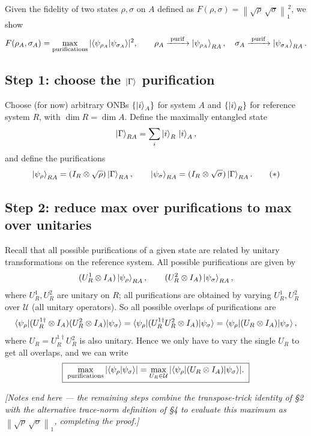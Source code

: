 \documentclass[11pt]{article}
\newcommand{\onenorm}[1]{\left\lVert #1 \right\rVert_{1}}
\newcommand{\Uni}{\mathcal{U}}
\begin{document}
Given the fidelity of two states $\rho,\sigma$ on $A$ defined as
$F(\rho,\sigma) = \onenorm{\sqrt{\rho}\,\sqrt{\sigma}}^{\,2}$, we show
\[
F(\rho_A,\sigma_A) = \max_{\text{purifications}}
|\!\braket{\psi_{\rho_A}|\psi_{\sigma_A}}\!|^{2},
\qquad
\rho_A \xrightarrow{\text{ purif }} \ket{\psi_{\rho_A}}_{RA},\quad
\sigma_A \xrightarrow{\text{ purif }} \ket{\psi_{\sigma_A}}_{RA}.
\]

\subsection{Step 1: choose the \texorpdfstring{$\ket{\Gamma}$}{Gamma} purification}

Choose (for now) arbitrary ONBs $\{\ket{i}_A\}$ for system $A$ and
$\{\ket{i}_R\}$ for reference system $R$, with $\dim R = \dim A$. Define the
maximally entangled state
\[
\ket{\Gamma}_{RA} = \sum_i \ket{i}_R\,\ket{i}_A,
\]
and define the purifications
\[
\ket{\psi_\rho}_{RA} = (I_R\otimes\sqrt{\rho})\ket{\Gamma}_{RA},
\qquad
\ket{\psi_\sigma}_{RA} = (I_R\otimes\sqrt{\sigma})\ket{\Gamma}_{RA}. \tag{$*$}
\]

\subsection{Step 2: reduce max over purifications to max over unitaries}

Recall that all possible purifications of a given state are related by unitary
transformations on the reference system. All possible purifications are given
by
\[
(U_R^{1}\otimes I_A)\ket{\psi_\rho}_{RA},
\qquad
(U_R^{2}\otimes I_A)\ket{\psi_\sigma}_{RA},
\]
where $U_R^{1},U_R^{2}$ are unitary on $R$; all purifications are obtained by
varying $U_R^{1},U_R^{2}$ over $\Uni$ (all unitary operators). So all possible
overlaps of purifications are
\[
\braket{\psi_\rho|(U_R^{1\dagger}\otimes I_A)(U_R^{2}\otimes I_A)|\psi_\sigma}
= \braket{\psi_\rho|(U_R^{1\dagger}U_R^{2}\otimes I_A)|\psi_\sigma}
= \braket{\psi_\rho|(U_R\otimes I_A)|\psi_\sigma},
\]
where $U_R = U_R^{1\dagger}U_R^{2}$ is also unitary. Hence we only have to vary
the single $U_R$ to get all overlaps, and we can write
\[
\boxed{\;
\max_{\text{purifications}} |\!\braket{\psi_\rho|\psi_\sigma}\!|
= \max_{U_R\in\Uni} |\!\braket{\psi_\rho|(U_R\otimes I_A)|\psi_\sigma}\!|.
\;}
\]

\medskip
\noindent\emph{[Notes end here --- the remaining steps combine the transpose-trick
identity of \S2 with the alternative trace-norm definition of \S4 to evaluate
this maximum as $\onenorm{\sqrt{\rho}\,\sqrt{\sigma}}$, completing the proof.]}
\end{document}
